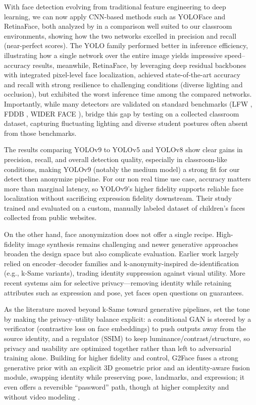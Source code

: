 \documentclass[12pt]{article}
\begin{document}
With face detection evolving from traditional feature engineering to deep learning, we can now apply CNN-based methods such as YOLOFace and RetinaFace, both analyzed by \cite{gf-ananda} in a comparison well suited to our classroom environments, showing how the two networks excelled in precision and recall (near-perfect scores). The YOLO family performed better in inference efficiency, illustrating how a single network over the entire image yields impressive speed–accuracy results, meanwhile, RetinaFace, by leveraging deep residual backbones with integrated pixel-level face localization, achieved state-of-the-art accuracy and recall with strong resilience to challenging conditions (diverse lighting and occlusion), but exhibited the worst inference time among the compared networks. Importantly, while many detectors are validated on standard benchmarks (LFW \cite{wildface}, FDDB \cite{fddb}, WIDER FACE \cite{widerface}), \cite{gf-ananda} bridge this gap by testing on a collected classroom dataset, capturing fluctuating lighting and diverse student postures often absent from those benchmarks.

The results \cite{ahmed} comparing YOLOv9 to YOLOv5 and YOLOv8 show clear gains in precision, recall, and overall detection quality, especially in classroom-like conditions, making YOLOv9 (notably the medium model) a strong fit for our detect then anonymize pipeline. For our non real time use case, accuracy matters more than marginal latency, so YOLOv9’s higher fidelity supports reliable face localization without sacrificing expression fidelity downstream. Their study trained and evaluated on a custom, manually labeled dataset of children’s faces collected from public websites.

On the other hand, face anonymization does not offer a single recipe. High-fidelity image synthesis remains challenging and newer generative approaches broaden the design space but also complicate evaluation. Earlier work largely relied on encoder–decoder families and k-anonymity-inspired de-identification (e.g., k-Same variants), trading identity suppression against visual utility. More recent systems aim for selective privacy—removing identity while retaining attributes such as expression and pose, yet faces open questions on guarantees.

As the literature moved beyond k-Same toward generative pipelines, \cite{yifan-wu} set the tone by making the privacy–utility balance explicit: a conditional GAN is steered by a verificator (contrastive loss on face embeddings) to push outputs away from the source identity, and a regulator (SSIM) to keep luminance/contrast/structure, so privacy and usability are optimized together rather than left to adversarial training alone. Building for higher fidelity and control, G2Face fuses a strong generative prior with an explicit 3D geometric prior and an identity-aware fusion module, swapping identity while preserving pose, landmarks, and expression; it even offers a reversible “password” path, though at higher complexity and without video modeling \cite{h-yang}. 
\end{document}
